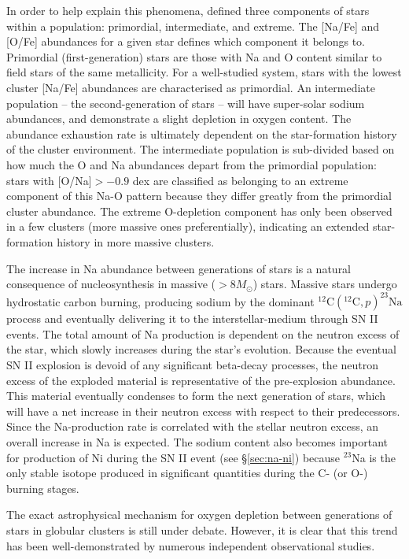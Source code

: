 \documentclass{emulateapj}
\begin{document}
In order to help explain this phenomena, \citet{Caretta;et-al_2009} defined three components of stars within a population: primordial, intermediate, and extreme. The [Na/Fe] and [O/Fe] abundances for a given star defines which component it belongs to. Primordial (first-generation) stars are those with Na and O content similar to field stars of the same metallicity. For a well-studied system, stars with the lowest cluster [Na/Fe] abundances are characterised as primordial. An intermediate population -- the second-generation of stars -- will have super-solar sodium abundances, and demonstrate a slight depletion in oxygen content. The  abundance exhaustion rate is ultimately dependent on the star-formation history of the cluster environment. The intermediate population is sub-divided based on how much the O and Na abundances depart from the primordial population: stars with [O/Na]$ > -0.9$ dex are classified as belonging to an extreme component of this Na-O pattern because they differ greatly from the primordial cluster abundance. The extreme O-depletion component has only been observed in a few clusters (more massive ones preferentially), indicating an extended star-formation history in more massive clusters.

The increase in Na abundance between generations of stars is a natural consequence of nucleosynthesis in massive ($>8 M_\odot$) stars. Massive stars undergo hydrostatic carbon burning, producing sodium by the dominant $^{12}\mbox{C}(^{12}\mbox{C}, p)^{23}\mbox{Na}$ process and eventually delivering it to the interstellar-medium through SN II events. The total amount of Na production is dependent on the neutron excess of the star, which slowly increases during the star's evolution. Because the eventual SN II explosion is devoid of any significant beta-decay processes, the neutron excess of the exploded material is representative of the pre-explosion abundance. This material eventually condenses to form the next generation of stars, which will have a net increase in their neutron excess with respect to their predecessors. Since the Na-production rate is correlated with the stellar neutron excess, an overall increase in Na is expected. The sodium content also becomes important for production of Ni during the SN II event (see \S\ref{sec:na-ni}) because $^{23}$Na is the only stable isotope produced in significant quantities during the C- (or O-) burning stages.



The exact astrophysical mechanism for oxygen depletion between generations of stars in globular clusters is still under debate. However, it is clear that this trend has been well-demonstrated by numerous independent observational studies. 
 
\end{document}
